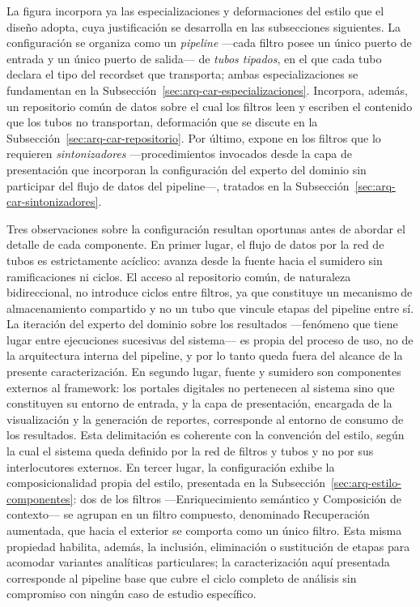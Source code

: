 \documentclass[12pt]{report}
\begin{document}
La figura incorpora ya las especializaciones y deformaciones del estilo que el diseño adopta, cuya justificación se desarrolla en las subsecciones siguientes. La configuración se organiza como un \textit{pipeline} ---cada filtro posee un único puerto de entrada y un único puerto de salida--- de \textit{tubos tipados}, en el que cada tubo declara el tipo del recordset que transporta; ambas especializaciones se fundamentan en la Subsección~\ref{sec:arq-car-especializaciones}. Incorpora, además, un repositorio común de datos sobre el cual los filtros leen y escriben el contenido que los tubos no transportan, deformación que se discute en la Subsección~\ref{sec:arq-car-repositorio}. Por último, expone en los filtros que lo requieren \textit{sintonizadores} ---procedimientos invocados desde la capa de presentación que incorporan la configuración del experto del dominio sin participar del flujo de datos del pipeline---, tratados en la Subsección~\ref{sec:arq-car-sintonizadores}.

Tres observaciones sobre la configuración resultan oportunas antes de abordar el detalle de cada componente. En primer lugar, el flujo de datos por la red de tubos es estrictamente acíclico: avanza desde la fuente hacia el sumidero sin ramificaciones ni ciclos. El acceso al repositorio común, de naturaleza bidireccional, no introduce ciclos entre filtros, ya que constituye un mecanismo de almacenamiento compartido y no un tubo que vincule etapas del pipeline entre sí. La iteración del experto del dominio sobre los resultados ---fenómeno que tiene lugar entre ejecuciones sucesivas del sistema--- es propia del proceso de uso, no de la arquitectura interna del pipeline, y por lo tanto queda fuera del alcance de la presente caracterización. En segundo lugar, fuente y sumidero son componentes externos al framework: los portales digitales no pertenecen al sistema sino que constituyen su entorno de entrada, y la capa de presentación, encargada de la visualización y la generación de reportes, corresponde al entorno de consumo de los resultados. Esta delimitación es coherente con la convención del estilo, según la cual el sistema queda definido por la red de filtros y tubos y no por sus interlocutores externos. En tercer lugar, la configuración exhibe la composicionalidad propia del estilo, presentada en la Subsección~\ref{sec:arq-estilo-componentes}: dos de los filtros ---Enriquecimiento semántico y Composición de contexto--- se agrupan en un filtro compuesto, denominado Recuperación aumentada, que hacia el exterior se comporta como un único filtro. Esta misma propiedad habilita, además, la inclusión, eliminación o sustitución de etapas para acomodar variantes analíticas particulares; la caracterización aquí presentada corresponde al pipeline base que cubre el ciclo completo de análisis sin compromiso con ningún caso de estudio específico.
\end{document}
